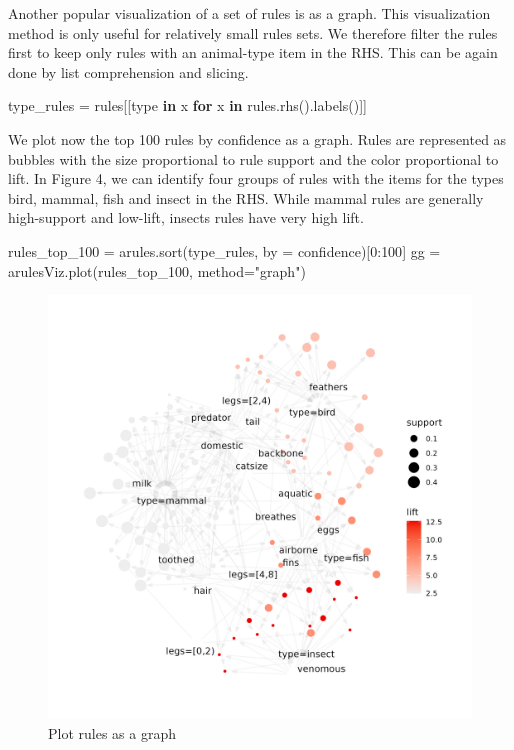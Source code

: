 \documentclass{article}
\newenvironment{Shaded}{}{}
\newcommand{\ControlFlowTok}[1]{\textcolor[rgb]{0.00,0.44,0.13}{\textbf{#1}}}
\newcommand{\DecValTok}[1]{\textcolor[rgb]{0.25,0.63,0.44}{#1}}
\newcommand{\KeywordTok}[1]{\textcolor[rgb]{0.00,0.44,0.13}{\textbf{#1}}}
\newcommand{\NormalTok}[1]{#1}
\newcommand{\OperatorTok}[1]{\textcolor[rgb]{0.40,0.40,0.40}{#1}}
\newcommand{\StringTok}[1]{\textcolor[rgb]{0.25,0.44,0.63}{#1}}
\begin{document}
Another popular visualization of a set of rules is as a graph. This
visualization method is only useful for relatively small rules sets. We
therefore filter the rules first to keep only rules with an animal-type
item in the RHS. This can be again done by list comprehension and
slicing.

\begin{Shaded}
\begin{Highlighting}[]
\NormalTok{type\_rules }\OperatorTok{=}\NormalTok{ rules[[}\StringTok{\textquotesingle{}type\textquotesingle{}} \KeywordTok{in}\NormalTok{ x }\ControlFlowTok{for}\NormalTok{ x }\KeywordTok{in}\NormalTok{ rules.rhs().labels()]]}
\end{Highlighting}
\end{Shaded}

We plot now the top 100 rules by confidence as a graph. Rules are
represented as bubbles with the size proportional to rule support and
the color proportional to lift. In Figure 4, we can identify four groups
of rules with the items for the types bird, mammal, fish and insect in
the RHS. While mammal rules are generally high-support and low-lift,
insects rules have very high lift.

\begin{Shaded}
\begin{Highlighting}[]
\NormalTok{rules\_top\_100 }\OperatorTok{=}\NormalTok{ arules.sort(type\_rules, by }\OperatorTok{=} \StringTok{\textquotesingle{}confidence\textquotesingle{}}\NormalTok{)[}\DecValTok{0}\NormalTok{:}\DecValTok{100}\NormalTok{]}
\NormalTok{gg }\OperatorTok{=}\NormalTok{ arulesViz.plot(rules\_top\_100, method}\OperatorTok{=}\StringTok{"graph"}\NormalTok{)}
\end{Highlighting}
\end{Shaded}

\begin{figure}

{\centering \includegraphics[width=0.7\linewidth]{graph} 

}

\caption{Plot rules as a graph}\label{fig:graph}
\end{figure}
\end{document}
